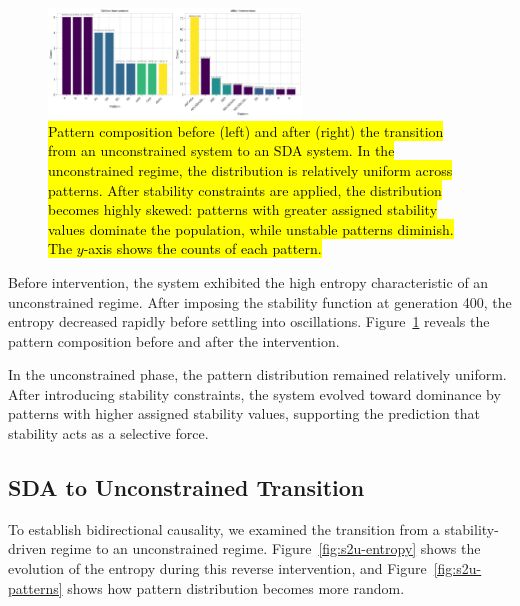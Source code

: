 \documentclass[preprint,12pt]{elsarticle}
\newcommand{\added}[1]{\hl{#1}}
\begin{document}
\begin{figure}[H]
    \centering
    \includegraphics[width=0.6\textwidth]{figure_7.png}
    \caption{\added{Pattern composition before (left) and after (right) the transition
    from an unconstrained system to an SDA system. In the unconstrained regime,
    the distribution is relatively uniform across patterns. After stability
    constraints are applied, the distribution becomes highly skewed: patterns with
    greater assigned stability values dominate the population, while unstable
    patterns diminish. The $y$-axis shows the counts of each pattern.}}
    \label{fig:u2s-patterns}
\end{figure}

Before intervention, the system exhibited the high entropy characteristic of an unconstrained regime. After imposing the stability function at generation 400, the entropy decreased rapidly before settling into oscillations. Figure~\ref{fig:u2s-patterns} reveals the pattern composition before and after the intervention.

In the unconstrained phase, the pattern distribution remained relatively uniform. After introducing stability constraints, the system evolved toward dominance by patterns with higher assigned stability values, supporting the prediction that stability acts as a selective force.

\subsection{SDA to Unconstrained Transition}

To establish bidirectional causality, we examined the transition from a stability-driven regime to an unconstrained regime. Figure~\ref{fig:s2u-entropy} shows the evolution of the entropy during this reverse intervention, and Figure~\ref{fig:s2u-patterns} shows how pattern distribution becomes more random.
\end{document}
